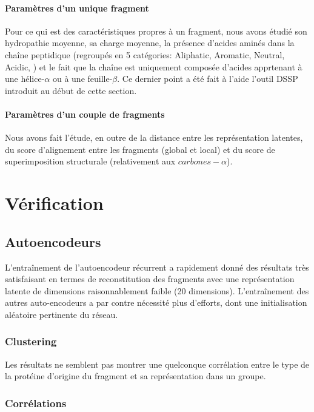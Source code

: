 \documentclass[a4paper, 11pt, onecolumn]{article}
\begin{document}
\paragraph{Paramètres d'un unique fragment}

Pour ce qui est des caractéristiques propres à un fragment, nous avons étudié
son hydropathie moyenne, sa charge moyenne, la présence d'acides aminés dans la
chaîne peptidique (regroupés en 5 catégories: Aliphatic, Aromatic, Neutral,
Acidic, ) et le fait que la chaîne est uniquement composée d'acides apprtenant à
une hélice-$\alpha$ ou à une feuille-$\beta$. Ce dernier point a été fait à
l'aide l'outil DSSP introduit au début de cette section.

\paragraph{Paramètres d'un couple de fragments}

Nous avons fait l'étude, en outre de la distance entre les représentation
latentes, du score d'alignement entre les fragments (global et local) et du score de superimposition structurale (relativement
aux $carbones-\alpha$).

\section{Vérification}

\subsection{Autoencodeurs}

L'entraînement de l'autoencodeur récurrent a rapidement donné des résultats très
satisfaisant en termes de reconstitution des fragments  avec une représentation
latente de dimensions raisonnablement faible (20 dimensions). L'entraînement des
autres auto-encodeurs a par contre nécessité plus d'efforts, dont une
initialisation aléatoire pertinente du réseau.

\subsubsection{Clustering}

Les résultats ne semblent pas montrer une quelconque corrélation entre le type
de la protéine d'origine du fragment et sa représentation dans un groupe.

\subsubsection{Corrélations}
\end{document}
